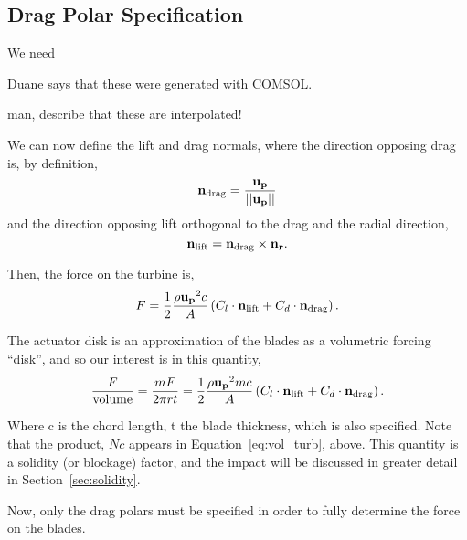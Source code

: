 \subsection{Drag Polar Specification}

We need 

Duane says that these were generated with COMSOL.

man, describe that these are interpolated!

We can now define the lift and drag
normals, where the direction opposing drag is, by definition, 
\begin{equation}
{\bf n_{\text{drag}}} = \frac{{\bf u_p}}{||{\bf u_p}||} 
\end{equation}
and the direction opposing lift orthogonal to the drag and the radial 
direction,  
\begin{equation}
{\bf n_{\text{lift}}}= {\bf n_{\text{drag}}} \times {\bf n_r}. 
\end{equation}

Then, the force on the turbine is, 
\begin{equation}
 F = \frac{1}{2}\frac{\rho {\bf u_p}^2 c}{A}\left(C_l \cdot
					      {\bf n_\text{lift}} + C_d \cdot
					      {\bf n_\text{drag}}  \right).
\label{eq:force_turb}
\end{equation}

The actuator disk is an approximation of the blades as a volumetric
forcing ``disk'', and so our interest is in this quantity,
\begin{equation}
\frac{F}{\text{volume}} = \frac{m F}{2 \pi r t} = \frac{1}{2}\frac{\rho
 {\bf u_p}^2 m c}{A}\left(C_l \cdot {\bf n_\text{lift}} + C_d \cdot {\bf
		   n_\text{drag}} \right).  
\label{eq:vol_turb}
\end{equation}

Where c is the chord length, t the blade thickness, which is also specified. 
Note that the product, $N c$ appears in Equation~\ref{eq:vol_turb},
above. This quantity is a solidity (or blockage) factor, and the impact
will be discussed in greater detail in Section~\ref{sec:solidity}. 

Now, only the drag polars must be
specified in order to fully determine the force on the blades.


